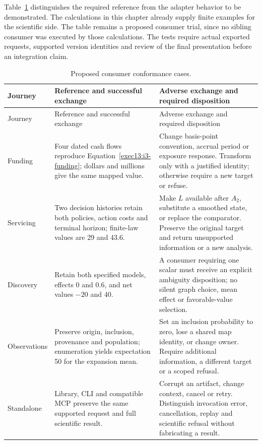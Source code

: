 Table~\ref{exec13:i3-conformance} distinguishes the required reference from
the adapter behavior to be demonstrated. The calculations in this chapter
already supply finite examples for the scientific side. The table remains a
proposed consumer trial, since no sibling consumer was executed by those
calculations. The tests require actual exported requests, supported version
identities and review of the final presentation before an integration claim.

\begin{longtable}{p{.17\linewidth}p{.37\linewidth}p{.37\linewidth}}
\caption{Proposed consumer conformance cases.}
\label{exec13:i3-conformance}\\
\toprule Journey & Reference and successful exchange & Adverse exchange and required disposition \\
\midrule\endfirsthead
\toprule Journey & Reference and successful exchange & Adverse exchange and required disposition \\
\midrule\endhead
Funding & Four dated cash flows reproduce
Equation~\eqref{exec13:i3-funding}; dollars and millions give the same
mapped value. & Change basis-point convention, accrual period or exposure
response. Transform only with a justified identity; otherwise require a
new target or refuse. \\
Servicing & Two decision histories retain both policies, action costs and
terminal horizon; finite-law values are 29 and 43.6. & Make $L$ available
after $A_2$, substitute a smoothed state, or replace the comparator. Preserve
the original target and return unsupported information or a new analysis. \\
Discovery & Retain both specified models, effects $0$ and $0.6$, and net
values $-20$ and $40$. & A consumer requiring one scalar must receive an
explicit ambiguity disposition; no silent graph choice, mean effect or
favorable-value selection. \\
Observations & Preserve origin, inclusion, provenance and population;
enumeration yields expectation 50 for the expansion mean. & Set an inclusion
probability to zero, lose a shared map identity, or change owner. Require
additional information, a different target or a scoped refusal. \\
Standalone & Library, CLI and compatible MCP preserve the same supported
request and full scientific result. & Corrupt an artifact, change context,
cancel or retry. Distinguish invocation error, cancellation, replay and
scientific refusal without fabricating a result. \\
\bottomrule
\end{longtable}

